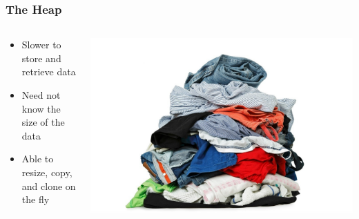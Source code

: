 \documentclass{beamer}
\begin{document}
\begin{frame}
    \frametitle{The Heap}
    \begin{columns}
        \begin{column}{0.5\textwidth}
            \begin{itemize}
                \item Slower to store and retrieve data
                \item Need not know the size of the data
                \item Able to resize, copy, and clone on the fly
            \end{itemize}
        \end{column}
        \begin{column}{0.5\textwidth}
            \includegraphics[width=\textwidth]{images/heap.png}
            \vfill
        \end{column}
    \end{columns}
\end{frame}
\end{document}
